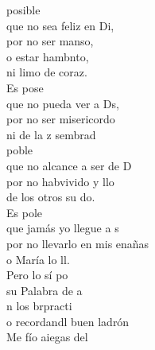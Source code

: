 \begin{cancion}%
	posible\\
	que no sea feliz en Di,\\
por no ser manso, \\
	o estar hambnto,\\
	ni limo de coraz.\\
\jump
	Es pose\\
	que no pueda ver a Ds,\\
	por no ser misericordo\\
	ni de la z sembrad\\
\jump
	 poble\\
	que no alcance a ser de D\\
	por no habvivido y llo\\
	de los otros su do.\\
\jump
	Es pole\\
	que jamás yo llegue a s\\
	por no llevarlo en mis enañas\\
	o María lo ll.\\
\jump
	Pero lo sí po \\
	su Palabra de a\\
	n los brpracti  \\
	o recordandl buen ladrón \\
	Me fío aiegas del\\
\jump
	         \\
\end{cancion}%
